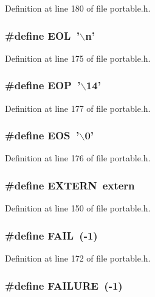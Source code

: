 Definition at line 180 of file portable.h.
\subsubsection{\setlength{\rightskip}{0pt plus 5cm}\#define EOL\ '$\backslash$n'}\label{portable_8h_a66}




Definition at line 175 of file portable.h.
\subsubsection{\setlength{\rightskip}{0pt plus 5cm}\#define EOP\ '$\backslash$14'}\label{portable_8h_a68}




Definition at line 177 of file portable.h.
\subsubsection{\setlength{\rightskip}{0pt plus 5cm}\#define EOS\ '$\backslash$0'}\label{portable_8h_a67}




Definition at line 176 of file portable.h.
\subsubsection{\setlength{\rightskip}{0pt plus 5cm}\#define EXTERN\ extern}\label{portable_8h_a55}




Definition at line 150 of file portable.h.
\subsubsection{\setlength{\rightskip}{0pt plus 5cm}\#define FAIL\ (-1)}\label{portable_8h_a64}




Definition at line 172 of file portable.h.
\subsubsection{\setlength{\rightskip}{0pt plus 5cm}\#define FAILURE\ (-1)}\label{portable_8h_a63}




